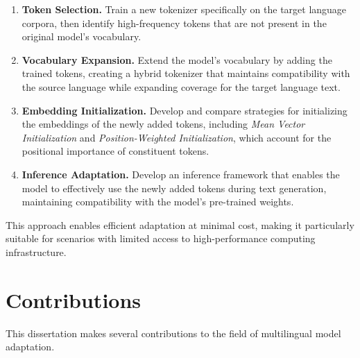 \begin{enumerate}
    \item \textbf{Token Selection.} Train a new tokenizer specifically on the target language corpora, then identify high-frequency tokens that are not present in the original model's vocabulary.
    \item \textbf{Vocabulary Expansion.} Extend the model's vocabulary by adding the trained tokens, creating a hybrid tokenizer that maintains compatibility with the source language while expanding coverage for the target language text.
    \item \textbf{Embedding Initialization.} Develop and compare strategies for initializing the embeddings of the newly added tokens, including \emph{Mean Vector Initialization} and \emph{Position-Weighted Initialization}, which account for the positional importance of constituent tokens.
    \item \textbf{Inference Adaptation.} Develop an inference framework that enables the model to effectively use the newly added tokens during text generation, maintaining compatibility with the model's pre-trained weights.
\end{enumerate}


This approach enables efficient adaptation at minimal cost, making it particularly suitable for scenarios with limited access to high-performance computing infrastructure.

\section{Contributions}\label{Section1.4}
This dissertation makes several contributions to the field of multilingual model adaptation.

